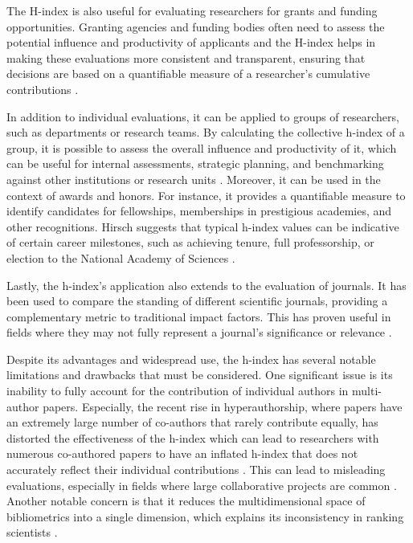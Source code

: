 The H-index is also useful for evaluating researchers for grants and funding
opportunities. Granting agencies and funding bodies often need to assess the
potential influence and productivity of applicants and the H-index helps in
making these evaluations more consistent and transparent, ensuring that
decisions are based on a quantifiable measure of a researcher's cumulative
contributions
\cite{hirsch2005index,bornmann2007what,costas2007h,waltman2012inconsistency,hirsch2014meaning,koltun2021h}.

In addition to individual evaluations, it can be applied to groups of
researchers, such as departments or research teams. By calculating the
collective h-index of a group, it is possible to assess the overall influence
and productivity of it, which can be useful for internal assessments, strategic
planning, and benchmarking against other institutions or research units
\cite{hirsch2005index,bornmann2007what,costas2007h,waltman2012inconsistency,egghe2010hirsch,hirsch2014meaning,koltun2021h}.
Moreover, it can be used in the context of awards and honors. For instance, it
provides a quantifiable measure to identify candidates for fellowships,
memberships in prestigious academies, and other recognitions. Hirsch suggests
that typical h-index values can be indicative of certain career milestones,
such as achieving tenure, full professorship, or election to the National
Academy of Sciences
\cite{hirsch2005index,bornmann2007what,costas2007h,waltman2012inconsistency,egghe2010hirsch,hirsch2014meaning}.

Lastly, the h-index's application also extends to the evaluation of journals.
It has been used to compare the standing of different scientific journals,
providing a complementary metric to traditional impact factors. This has proven
useful in fields where they may not fully represent a journal's significance or
relevance \cite{norris2010h}.

Despite its advantages and widespread use, the h-index has several notable
limitations and drawbacks that must be considered. One significant issue is its
inability to fully account for the contribution of individual authors in
multi-author papers. Especially, the recent rise in hyperauthorship, where
papers have an extremely large number of co-authors that rarely contribute
equally, has distorted the effectiveness of the h-index which can lead to
researchers with numerous co-authored papers to have an inflated h-index that
does not accurately reflect their individual contributions
\cite{koltun2021h,bihari2018h}. This can lead to misleading evaluations,
especially in fields where large collaborative projects are common
\cite{hirsch2005index,bornmann2007what,costas2007h,waltman2012inconsistency,norris2010h,egghe2010hirsch,hirsch2014meaning}.
Another notable concern is that it reduces the multidimensional space of
bibliometrics into a single dimension, which explains its inconsistency in
ranking scientists \cite{bornmann2007what}.


